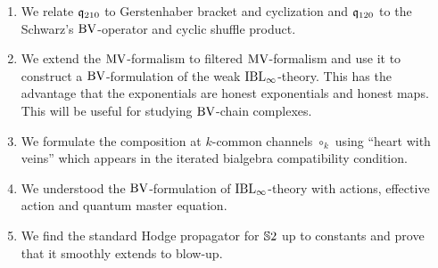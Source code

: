 \documentclass[\MainFolder/Text.tex]{subfiles}
\begin{document}
\begin{enumerate}[label=\arabic*)]
\item We relate $\mathfrak{q}_{210}$ to Gerstenhaber bracket and cyclization and $\mathfrak{q}_{120}$ to the Schwarz's $\mathrm{BV}$-operator and cyclic shuffle product.

\item We extend the $\mathrm{MV}$-formalism to filtered $\mathrm{MV}$-formalism and use it to construct a $\mathrm{BV}$-formulation of the weak $\mathrm{IBL}_\infty$-theory. This has the advantage that the exponentials are honest exponentials and honest maps. This will be useful for studying $\mathrm{BV}$-chain complexes.

\item We formulate the composition at $k$-common channels $\circ_k$ using ``heart with veins'' which appears in the iterated bialgebra compatibility condition.

\item We understood the $\mathrm{BV}$-formulation of $\mathrm{IBL}_\infty$-theory with actions, effective action and quantum master equation.

\item We find the standard Hodge propagator for $\mathbb{S}{2}$ up to constants and prove that it smoothly extends to blow-up.
\end{enumerate}

%
\end{document}
